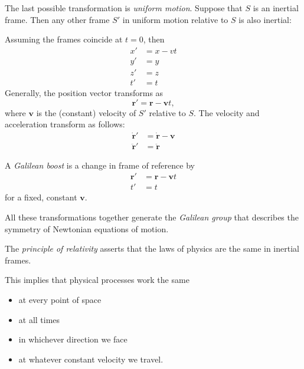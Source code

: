 \documentclass[a4paper]{article}
\begin{document}
The last possible transformation is \emph{uniform motion}. Suppose that $S$ is an inertial frame. Then any other frame $S'$ in uniform motion relative to $S$ is also inertial:
\begin{center}
\end{center}
Assuming the frames coincide at $t = 0$, then
\begin{align*}
  x' &= x - vt\\
  y' &= y\\
  z' &= z\\
  t' &= t
\end{align*}
Generally, the position vector transforms as
\[
  \mathbf{r}' = \mathbf{r} - \mathbf{v}t,
\]
where $\mathbf{v}$ is the (constant) velocity of $S'$ relative to $S$. The velocity and acceleration transform as follows:
\begin{align*}
  \dot{\mathbf{r}}' &= \dot{\mathbf{r}} - \mathbf{v}\\
  \ddot{\mathbf{r}}' &= \ddot{\mathbf{r}}
\end{align*}
\begin{defi}
  A \emph{Galilean boost} is a change in frame of reference by
  \begin{align*}
    \mathbf{r}' &= \mathbf{r} - \mathbf{v}t\\
    t' &= t
  \end{align*}
  for a fixed, constant $\mathbf{v}$.
\end{defi}

All these transformations together generate the \emph{Galilean group} that describes the symmetry of Newtonian equations of motion.

\begin{law}
  The \emph{principle of relativity} asserts that the laws of physics are the same in inertial frames.
\end{law}

This implies that physical processes work the same
\begin{itemize}
  \item at every point of space
  \item at all times
  \item in whichever direction we face
  \item at whatever constant velocity we travel.
\end{itemize}
\end{document}
